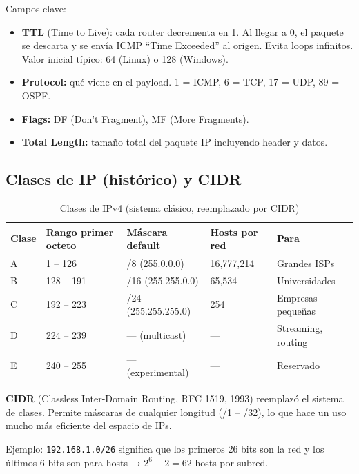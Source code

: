 Campos clave:
\begin{itemize}
    \item \textbf{TTL} (Time to Live): cada router decrementa en 1. Al llegar
          a 0, el paquete se descarta y se envía ICMP ``Time Exceeded'' al origen.
          Evita loops infinitos. Valor inicial típico: 64 (Linux) o 128 (Windows).
    \item \textbf{Protocol:} qué viene en el payload.
          1 = ICMP, 6 = TCP, 17 = UDP, 89 = OSPF.
    \item \textbf{Flags:} DF (Don't Fragment), MF (More Fragments).
    \item \textbf{Total Length:} tamaño total del paquete IP incluyendo header y datos.
\end{itemize}

\subsection{Clases de IP (histórico) y CIDR}

\begin{table}[h!]
\centering
\renewcommand{\arraystretch}{1.4}
\begin{tabular}{lllll}
\toprule
\textbf{Clase} & \textbf{Rango primer octeto} & \textbf{Máscara default} & \textbf{Hosts por red} & \textbf{Para} \\
\midrule
A & 1 -- 126      & /8  (255.0.0.0)     & 16,777,214 & Grandes ISPs \\
B & 128 -- 191    & /16 (255.255.0.0)   & 65,534     & Universidades \\
C & 192 -- 223    & /24 (255.255.255.0) & 254        & Empresas pequeñas \\
D & 224 -- 239    & --- (multicast)     & ---        & Streaming, routing \\
E & 240 -- 255    & --- (experimental)  & ---        & Reservado \\
\bottomrule
\end{tabular}
\caption{Clases de IPv4 (sistema clásico, reemplazado por CIDR)}
\end{table}

\begin{concepto}
\textbf{CIDR} (Classless Inter-Domain Routing, RFC 1519, 1993) reemplazó el
sistema de clases. Permite máscaras de cualquier longitud (/1 -- /32),
lo que hace un uso mucho más eficiente del espacio de IPs.

Ejemplo: \texttt{192.168.1.0/26} significa que los primeros 26 bits son la red
y los últimos 6 bits son para hosts → $2^6 - 2 = 62$ hosts por subred.
\end{concepto}

